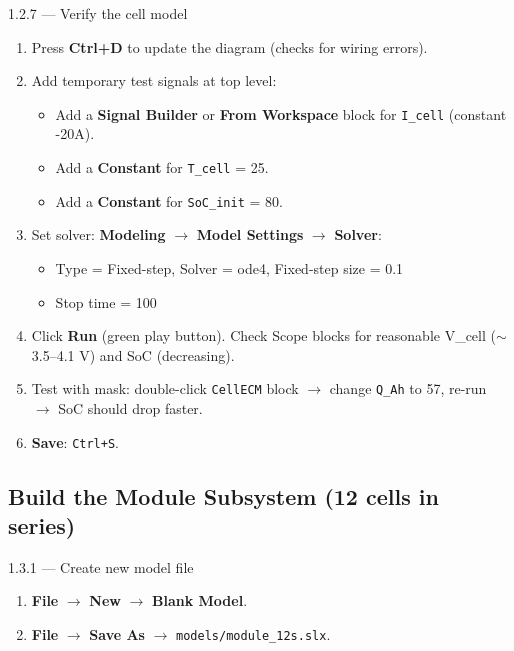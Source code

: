 \documentclass[11pt,a4paper]{article}
\begin{document}
\begin{guistep}{1.2.7 — Verify the cell model}
\begin{enumerate}
    \item Press \textbf{Ctrl+D} to update the diagram (checks for wiring errors).
    \item Add temporary test signals at top level:
    \begin{itemize}
        \item Add a \textbf{Signal Builder} or \textbf{From Workspace} block for \texttt{I\_cell} (constant -20A).
        \item Add a \textbf{Constant} for \texttt{T\_cell} = 25.
        \item Add a \textbf{Constant} for \texttt{SoC\_init} = 80.
    \end{itemize}
    \item Set solver: \textbf{Modeling} $\to$ \textbf{Model Settings} $\to$ \textbf{Solver}:
    \begin{itemize}
        \item Type = Fixed-step, Solver = ode4, Fixed-step size = 0.1
        \item Stop time = 100
    \end{itemize}
    \item Click \textbf{Run} (green play button). Check Scope blocks for reasonable V\_cell ($\sim$3.5--4.1 V) and SoC (decreasing).
    \item Test with mask: double-click \texttt{CellECM} block $\to$ change \texttt{Q\_Ah} to 57, re-run $\to$ SoC should drop faster.
    \item \textbf{Save}: \texttt{Ctrl+S}.
\end{enumerate}
\end{guistep}

\subsection{Build the Module Subsystem (12 cells in series)}

\begin{guistep}{1.3.1 — Create new model file}
\begin{enumerate}
    \item \textbf{File} $\to$ \textbf{New} $\to$ \textbf{Blank Model}.
    \item \textbf{File} $\to$ \textbf{Save As} $\to$ \texttt{models/module\_12s.slx}.
\end{enumerate}
\end{guistep}
\end{document}
